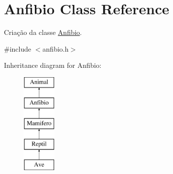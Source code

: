 \hypertarget{class_anfibio}{}\section{Anfibio Class Reference}
\label{class_anfibio}


Criação da classe \mbox{\hyperlink{class_anfibio}{Anfibio}}.  




{\ttfamily \#include $<$anfibio.\+h$>$}

Inheritance diagram for Anfibio\+:\begin{figure}[H]
\begin{center}
\leavevmode
\includegraphics[height=5.000000cm]{class_anfibio}
\end{center}
\end{figure}
